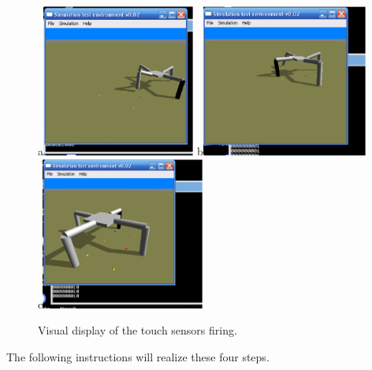 \documentclass[12pt]{article}
\begin{document}
\begin{figure}
\centerline{
a\includegraphics[height=5cm]{Quad1.eps}
b\includegraphics[height=5cm]{Quad2.eps}
c\includegraphics[height=5cm]{Quad3.eps}}
\caption{Visual display of the touch sensors firing.}
\label{Fig1}
\end{figure}

The following instructions will realize these four steps.
\end{document}
